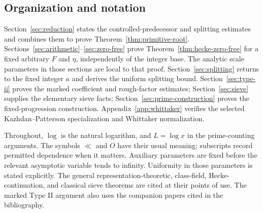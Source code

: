 \subsection{Organization and notation}

Section~\ref{sec:reduction} states the controlled-predecessor and
splitting estimates and combines them to prove
Theorem~\ref{thm:primitive-root}. Sections~\ref{sec:arithmetic}--\ref{sec:zero-free}
prove Theorem~\ref{thm:hecke-zero-free} for a fixed arbitrary $F$
and $\eta$, independently of the integer base. The analytic scale
parameters in those sections are local to that proof.
Section~\ref{sec:splitting} returns to the fixed integer $a$ and
derives the uniform splitting bound. Section~\ref{sec:type-ii}
proves the marked coefficient and rough-factor estimates;
Section~\ref{sec:sieve} supplies the elementary sieve facts;
Section~\ref{sec:prime-construction} proves the fixed-progression
construction. Appendix~\ref{app:whittaker} verifies the selected
Kazhdan--Patterson specialization and Whittaker normalization.

Throughout, $\log$ is the natural logarithm, and $L=\log x$ in the
prime-counting arguments. The symbols $\ll$ and
$O$ have their usual meaning; subscripts record permitted dependence
when it matters. Auxiliary parameters are fixed before the relevant
asymptotic variable tends to infinity. Uniformity in those parameters
is stated explicitly. The general representation-theoretic,
class-field, Hecke-continuation, and classical sieve theorems are
cited at their points of use. The marked Type II argument also uses
the companion papers cited in the bibliography.

